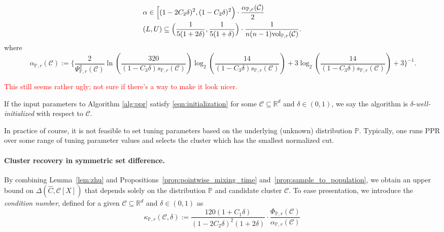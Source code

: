 \documentclass[11pt,twoside]{article}
\newcommand{\Reals}{\mathbb{R}}
\newcommand{\1}{\mathbf{1}}
\newcommand{\Rd}{\Reals^d}
\newcommand{\mc}[1]{\mathcal{#1}}
\newcommand{\Pbb}{\mathbb{P}}
\newcommand{\wh}[1]{\widehat{#1}}
\newcommand{\vol}{\mathrm{vol}}
\begin{document}
\begin{equation}
\label{eqn:initialization}
\begin{aligned}
& \alpha \in \Bigl[(1 - 2C_2\delta)^2, (1 - C_2\delta)^2\Bigr) \cdot
 \frac{\alpha_{\Pbb,r}(\mc{C})}{2} \\
& (L,U) \subseteq \Bigl(\frac{1}{5(1 + 2\delta)},\frac{1}{5(1 + \delta)}\Bigr) \cdot 
\frac{1}{n(n - 1)\vol_{\Pbb,r}(\mc{C})}.
\end{aligned}  
\end{equation}
where
\begin{equation}\
\label{eqn:alpha_initialization}
\alpha_{\Pbb,r}(\mc{C}) := \biggl\{ \frac{2}{\Psi_{\Pbb,r}^2(\mc{C})} \ln \left(\frac{320}{(1 - C_3\delta)s_{\Pbb,r}(\mc{C})}\right)\log_2 \left(\frac{14}{(1 - C_3\delta)s_{\Pbb,r}(\mc{C})}\right)  + 3 \log_2 \left(\frac{14}{(1 - C_3\delta) s_{\Pbb,r}(\mc{C})}\right) + 3\biggr\}^{-1}.
\end{equation}

\textcolor{red}{This still seems rather ugly; not sure if there's a way to make it look nicer.}

\begin{definition}
	If the input parameters to Algorithm \ref{alg:ppr} satisfy \eqref{eqn:initialization} for some $\mc{C} \subseteq \Rd$ and $\delta \in (0,1)$, we say the algorithm is $\delta$-\emph{well-initialized} with respect to $\mc{C}$.
\end{definition}

In practice of course, it is not feasible to set tuning parameters based on the 
underlying (unknown) distribution $\Pbb$. Typically, one runs PPR over some range of
tuning parameter values and selects the cluster which has the smallest
normalized cut.  

\paragraph{Cluster recovery in symmetric set difference.} By combining Lemma~\ref{lem:zhu} and Propositions~\ref{prop:pointwise_mixing_time} and~\ref{prop:sample_to_population}, we obtain an upper bound on $\Delta(\wh{C},\mc{C}[X])$ that depends solely on the distribution $\Pbb$ and candidate cluster $\mc{C}$. To ease presentation, we introduce the \emph{condition number}, defined for a given $\mc{C} \subseteq \Rd$ and $\delta \in (0,1)$ as
\begin{equation}
\label{eqn:condition_number}
\kappa_{\Pbb,r}(\mc{C},\delta) := \frac{120 (1 + C_1\delta)}{(1 - 2C_2\delta)^2(1 + 2\delta)} \cdot \frac{\Phi_{\Pbb,r}(\mc{C})}{\alpha_{\Pbb,r}(\mc{C})}
\end{equation}
\end{document}
